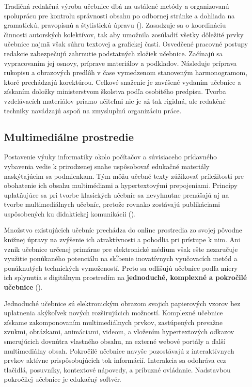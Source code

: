 Tradičná redakčná výroba učebnice dbá na ustálené metódy a organizovanú spoluprácu pre kontrolu správnosti obsahu po odbornej stránke a dohliada na gramatickú, pravopisnú a štylistickú úpravu (\cite{mlady_tvorba_1988}). Zasadzuje sa o koordináciu činnosti autorských kolektívov, tak aby umožnila zosúladiť všetky dôležité prvky učebnice najmä však súhru textovej a grafickej časti. Osvedčené pracovné postupy redakcie zabezpečujú zahrnutie podstatných zložiek učebnice. Začínajú sa vypracovaním jej osnovy, príprave materiálov a podkladov. Následuje príprava rukopisu a obrazových predlôh v čase vymedzenom stanoveným harmonogramom, ktoré prechádzajú korektúrou. Celkové snaženie je zavŕšené vydaním učebnice a získaním doložky ministerstvom školstva podľa osobitého predpisu. Tvorba vzdelávacích materiálov priamo učiteľmi nie je až tak rigidná, ale redakčné techniky navádzajú aspoň na zmysluplnú organizáciu práce.

\subsection{Multimediálne prostredie}
Postavenie výuky informatiky okolo počítačov a súvisiaceho prídavného vybavenia vedie k prirodzenej snahe uspôsobovať edukačné materiály naskýtajúcim sa podmienkam. Tým môžu učebné texty zúžikovať príležitosti pre obohatenie ich obsahu multimédiami a hypertextovými prepojeniami. Princípy uplatňujúce sa pri tvorbe klasických učebníc sa nevyhnutne prenášajú aj na tvorbe multimediálnych učebníc, pretože rovnako zostávajú publikáciami uspôsobených ku didaktickej komunikácii (\cite{krotky_nove_2015}).

Množstvo existujúcich učebníc prechádza do online prostredia zo svojej pôvodne knižnej úpravy na zvýšenie ich atraktívnosti a pohodlia pri prístupe k nim. Ani vznik učebnice určenej primárne pre elektronické médium však ešte nezaručuje využitie ponúkaného potenciálu na skĺbenie inovatívnych vyučovacích metód a ponúknutých technických vymožeností. Preto sa odlišujú učebnice podľa miery ich splynutia s digitálnym prostredím na \textbf{jednoduché, komplexné a pokročilé učebnice} (\cite{krotky_nove_2015}).

Jednoduché učebnice sú elektronickým obrazom svojich papierových vzorov bez uplatnenia akýkoľvek nových rozširujúcich možností. Komplexné učebnice získame zakomponovaním multimediálnych prvkov, zastúpených prevažne zvukmi, obrázkami, animáciami, videom, a vložením  hypertextových odkazov smerujúcich dovnútra vlastného obsahu, na externé webové portály a ďalší multimediálny obsah. Pokročilé učebnice navyše pozostávajú z interaktívnych prvkov aktívne prispôsobujúcich tok informácií. Interakcia sa odohráva cez tlačidlá, posuvníky, kontextové nápovedy, a príbuzné ovládanie. Nadstavbou pokročilej učebnice je edukačný softvér.

